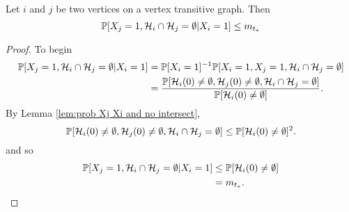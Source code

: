 	\begin{lemma}
		\label{lem: prob X_j and no intersect given X_i = 1}
		Let $i$ and $j$ be two vertices on a vertex transitive graph. Then
		\begin{equation}
			\mathbb{P}[X_j = 1, \mathcal{H}_i \cap\mathcal{H}_j = \emptyset|X_i = 1] \leq m_{t_*}
		\end{equation}
	\end{lemma}
	\begin{proof}
		To begin
		\begin{align}
			\mathbb{P}[X_j = 1, \mathcal{H}_i \cap\mathcal{H}_j = \emptyset|X_i = 1] &= \mathbb{P}[X_i = 1]^{-1}\mathbb{P}[X_i = 1, X_j = 1, \mathcal{H}_i \cap\mathcal{H}_j = \emptyset]\\
			&= \frac{\mathbb{P}[\mathcal{H}_i(0) \neq \emptyset, \mathcal{H}_j(0) \neq \emptyset, \mathcal{H}_i \cap \mathcal{H}_j = \emptyset]}{\mathbb{P}[\mathcal{H}_i(0) \neq \emptyset]}.
		\end{align}
		By Lemma \ref{lem:prob Xj Xi and no intersect}, 
		\begin{equation}
			\mathbb{P}[\mathcal{H}_i(0) \neq \emptyset, \mathcal{H}_j(0) \neq \emptyset, \mathcal{H}_i \cap \mathcal{H}_j = \emptyset] \leq \mathbb{P}[\mathcal{H}_i(0) \neq \emptyset]^2.
		\end{equation}
		and so
		\begin{align}
			\mathbb{P}[X_j = 1, \mathcal{H}_i \cap\mathcal{H}_j = \emptyset|X_i = 1] &\leq \mathbb{P}[\mathcal{H}_i(0) \neq \emptyset]\\
			&= m_{t_*}.
		\end{align}
	\end{proof}

